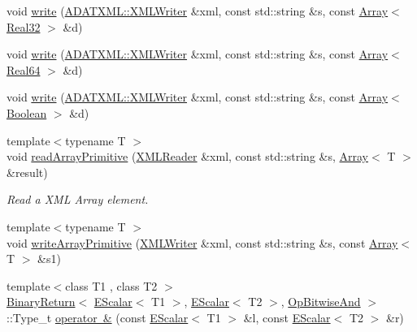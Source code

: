 \begin{DoxyCompactItemize}
\item 
void \mbox{\hyperlink{namespaceENSEM_a5d6d46f2975052a57ae6d284798b574a}{write}} (\mbox{\hyperlink{classADATXML_1_1XMLWriter}{A\+D\+A\+T\+X\+M\+L\+::\+X\+M\+L\+Writer}} \&xml, const std\+::string \&s, const \mbox{\hyperlink{classXMLArray_1_1Array}{Array}}$<$ \mbox{\hyperlink{group__defs_gab601f1c55eb75baed0a0859b3fec6bc1}{Real32}} $>$ \&d)
\item 
void \mbox{\hyperlink{namespaceENSEM_a3723b1ab200b48b7d24a4beee45aceef}{write}} (\mbox{\hyperlink{classADATXML_1_1XMLWriter}{A\+D\+A\+T\+X\+M\+L\+::\+X\+M\+L\+Writer}} \&xml, const std\+::string \&s, const \mbox{\hyperlink{classXMLArray_1_1Array}{Array}}$<$ \mbox{\hyperlink{group__defs_gaae0bff35c031375b1ffeb693402496c8}{Real64}} $>$ \&d)
\item 
void \mbox{\hyperlink{namespaceENSEM_ac8d30a87c5709126729f9c0169804c2a}{write}} (\mbox{\hyperlink{classADATXML_1_1XMLWriter}{A\+D\+A\+T\+X\+M\+L\+::\+X\+M\+L\+Writer}} \&xml, const std\+::string \&s, const \mbox{\hyperlink{classXMLArray_1_1Array}{Array}}$<$ \mbox{\hyperlink{group__defs_ga38f0cd64d26e121e75367986f2d7cd6c}{Boolean}} $>$ \&d)
\item 
{\footnotesize template$<$typename T $>$ }\\void \mbox{\hyperlink{namespaceENSEM_a595aa36e757c1e7259eeaf7e6421941c}{read\+Array\+Primitive}} (\mbox{\hyperlink{classADATXML_1_1XMLReader}{X\+M\+L\+Reader}} \&xml, const std\+::string \&s, \mbox{\hyperlink{classXMLArray_1_1Array}{Array}}$<$ T $>$ \&result)
\begin{DoxyCompactList}\small\item\em Read a X\+ML Array element. \end{DoxyCompactList}\item 
{\footnotesize template$<$typename T $>$ }\\void \mbox{\hyperlink{namespaceENSEM_aa9532f5b330c3180eaff3decbb77eb4b}{write\+Array\+Primitive}} (\mbox{\hyperlink{classADATXML_1_1XMLWriter}{X\+M\+L\+Writer}} \&xml, const std\+::string \&s, const \mbox{\hyperlink{classXMLArray_1_1Array}{Array}}$<$ T $>$ \&s1)
\item 
{\footnotesize template$<$class T1 , class T2 $>$ }\\\mbox{\hyperlink{structENSEM_1_1BinaryReturn}{Binary\+Return}}$<$ \mbox{\hyperlink{classENSEM_1_1EScalar}{E\+Scalar}}$<$ T1 $>$, \mbox{\hyperlink{classENSEM_1_1EScalar}{E\+Scalar}}$<$ T2 $>$, \mbox{\hyperlink{structENSEM_1_1OpBitwiseAnd}{Op\+Bitwise\+And}} $>$\+::Type\+\_\+t \mbox{\hyperlink{namespaceENSEM_ga445352dd6ecea4dcb57bfd1abcda2a0b}{operator \&}} (const \mbox{\hyperlink{classENSEM_1_1EScalar}{E\+Scalar}}$<$ T1 $>$ \&l, const \mbox{\hyperlink{classENSEM_1_1EScalar}{E\+Scalar}}$<$ T2 $>$ \&r)

\end{DoxyCompactItemize}
